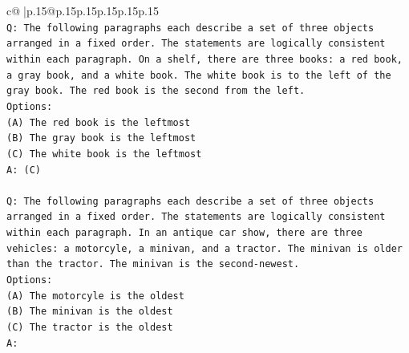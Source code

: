 \documentclass{article}
\begin{document}
{\begin{supertabular}{c@{$\;$}|p{.15\linewidth}@{}p{.15\linewidth}p{.15\linewidth}p{.15\linewidth}p{.15\linewidth}p{.15\linewidth}}
{{{\\ 
\texttt{Q: The following paragraphs each describe a set of three objects arranged in a fixed order. The statements are logically consistent within each paragraph. On a shelf, there are three books: a red book, a gray book, and a white book. The white book is to the left of the gray book. The red book is the second from the left.} \\
\texttt{Options:} \\
\texttt{(A) The red book is the leftmost} \\
\texttt{(B) The gray book is the leftmost} \\
\texttt{(C) The white book is the leftmost} \\
\texttt{A: (C)} \\
\\ 
\texttt{Q: The following paragraphs each describe a set of three objects arranged in a fixed order. The statements are logically consistent within each paragraph. In an antique car show, there are three vehicles: a motorcyle, a minivan, and a tractor. The minivan is older than the tractor. The minivan is the second{-}newest.} \\
\texttt{Options:} \\
\texttt{(A) The motorcyle is the oldest} \\
\texttt{(B) The minivan is the oldest} \\
\texttt{(C) The tractor is the oldest} \\
\texttt{A:} \\
            }
        }
    }
     \\ \\


\end{supertabular}}
\end{document}
